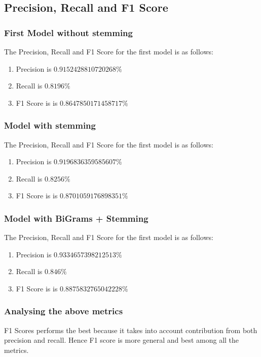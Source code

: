 \documentclass[11pt]{article}
\begin{document}
\subsection{Precision, Recall and F1 Score}
\subsubsection{First Model without stemming}
The Precision, Recall and F1 Score for the first model is as follows:
\begin{enumerate}
  \item Precision is $0.9152428810720268\%$
  \item Recall is $0.8196\%$
  \item F1 Score is is $0.8647850171458717\%$
\end{enumerate}
\subsubsection{Model with stemming}
The Precision, Recall and F1 Score for the first model is as follows:
\begin{enumerate}
  \item Precision is $0.9196836359585607\%$
  \item Recall is $0.8256\%$
  \item F1 Score is is $0.8701059176898351\%$
\end{enumerate}
\subsubsection{Model with BiGrams + Stemming}
The Precision, Recall and F1 Score for the first model is as follows:
\begin{enumerate}
  \item Precision is $0.9334657398212513\%$
  \item Recall is $0.846\%$
  \item F1 Score is is $0.8875832765042228\%$
\end{enumerate}

\subsubsection{Analysing the above metrics}
F1 Scores performs the best because it takes into account contribution from both precision and recall. Hence F1 score is more general and best among all the metrics.
\end{document}
